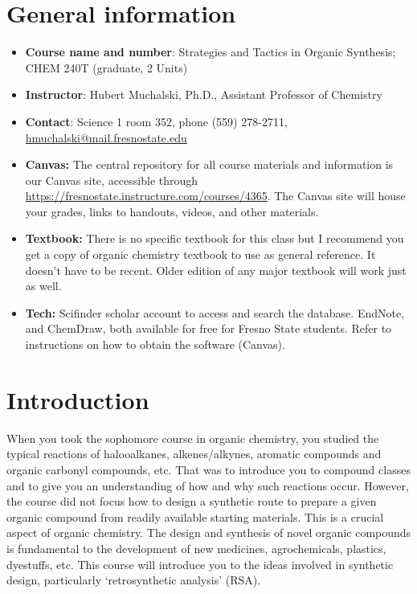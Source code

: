 \hypertarget{general-information}{%
\section{General information}\label{general-information}}

\begin{itemize}
\tightlist
\item
  \textbf{Course name and number}: Strategies and Tactics in Organic
  Synthesis; CHEM 240T (graduate, 2 Units)
\item
  \textbf{Instructor}: Hubert Muchalski, Ph.D., Assistant Professor of
  Chemistry
\item
  \textbf{Contact}: Science 1 room 352, phone (559) 278-2711,
  \url{hmuchalski@mail.fresnostate.edu}
\item
  \textbf{Canvas:} The central repository for all course materials and
  information is our Canvas site, accessible through
  \url{https://fresnostate.instructure.com/courses/4365}. The Canvas
  site will house your grades, links to handouts, videos, and other
  materials.
\item
  \textbf{Textbook:} There is no specific textbook for this class but I
  recommend you get a copy of organic chemistry textbook to use as
  general reference. It doesn't have to be recent. Older edition of any
  major textbook will work just as well.
\item
  \textbf{Tech:} Scifinder scholar account to access and search the
  database. EndNote, and ChemDraw, both available for free for Fresno
  State students. Refer to instructions on how to obtain the software
  (Canvas).
\end{itemize}

\hypertarget{introduction}{%
\section{Introduction}\label{introduction}}

When you took the sophomore course in organic chemistry, you studied the
typical reactions of halooalkanes, alkenes/alkynes, aromatic compounds
and organic carbonyl compounds, etc. That was to introduce you to
compound classes and to give you an understanding of how and why such
reactions occur. However, the course did not focus how to design a
synthetic route to prepare a given organic compound from readily
available starting materials. This is a crucial aspect of organic
chemistry. The design and synthesis of novel organic compounds is
fundamental to the development of new medicines, agrochemicals,
plastics, dyestuffs, etc. This course will introduce you to the ideas
involved in synthetic design, particularly `retrosynthetic analysis'
(RSA).

